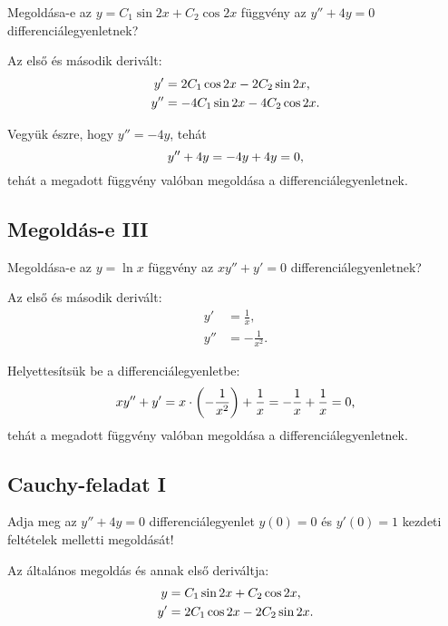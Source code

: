 \documentclass{szb-solution}
\begin{document}
Megoldása-e az $y = C_1 \sin 2x + C_2 \cos 2x$ függvény az $y'' + 4y = 0$
differenciálegyenletnek?

Az első és második derivált:
\begin{align*}
  y'  & = 2C_1 \cos 2x - 2C_2 \sin 2x \text,  \\
  y'' & = -4C_1 \sin 2x - 4C_2 \cos 2x \text.
\end{align*}

Vegyük észre, hogy $y'' = -4y$, tehát
$$
  y'' + 4y = -4y + 4y = 0
  \text,
$$
tehát a megadott függvény valóban megoldása a differenciálegyenletnek.


\subsection{Megoldás-e III}

Megoldása-e az $y = \ln x$ függvény az $xy'' + y' = 0$ differenciálegyenletnek?

Az első és második derivált:
\begin{align*}
  y'  & = \frac{1}{x},    \\
  y'' & = -\frac{1}{x^2}.
\end{align*}

Helyettesítsük be a differenciálegyenletbe:
$$
  xy'' + y' = x \cdot \left( -\frac{1}{x^2} \right) + \frac{1}{x} = -\frac{1}{x} + \frac{1}{x} = 0
  \text,
$$
tehát a megadott függvény valóban megoldása a differenciálegyenletnek.


\subsection{Cauchy-feladat I}

Adja meg az $y'' + 4y = 0$ differenciálegyenlet $y(0) = 0$ és $y'(0) = 1$
kezdeti feltételek melletti megoldását!

Az általános megoldás és annak első deriváltja:
\begin{align*}
  y  & = C_1 \sin 2x + C_2 \cos 2x \text,   \\
  y' & = 2C_1 \cos 2x - 2C_2 \sin 2x \text.
\end{align*}
\end{document}
